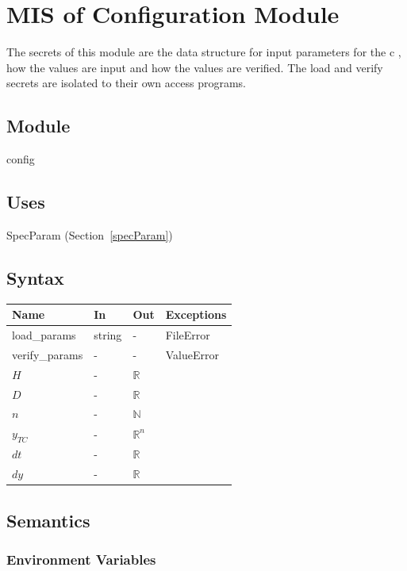 \documentclass[12pt, titlepage]{article}
\begin{document}
\newpage

\section{MIS of Configuration Module} \label{config}

The secrets of this module are the data structure for input parameters for the c , how the
values are input and how the values are verified.  The load and verify secrets
are isolated to their own access programs.

\subsection{Module}

config

\subsection{Uses}

SpecParam (Section~\ref{specParam})

\subsection{Syntax}

\begin{tabular}{p{3cm} p{1cm} p{1cm} >{\raggedright\arraybackslash}p{9cm}}
\toprule
\textbf{Name} & \textbf{In} & \textbf{Out} & \textbf{Exceptions} \\
\midrule
load\_params & string & - &  FileError\\
verify\_params & - & - & ValueError\\
$H$ & - & $\mathbb{R}$\\
$D$ & - & $\mathbb{R}$\\
$n$ & - & $\mathbb{N}$\\
$y_{TC}$ & - & $\mathbb{R}^n$\\
$dt$ & - & $\mathbb{R}$ \\
$dy$ & - & $\mathbb{R}$\\

\bottomrule
\end{tabular}

\subsection{Semantics}

\subsubsection{Environment Variables}
\end{document}
